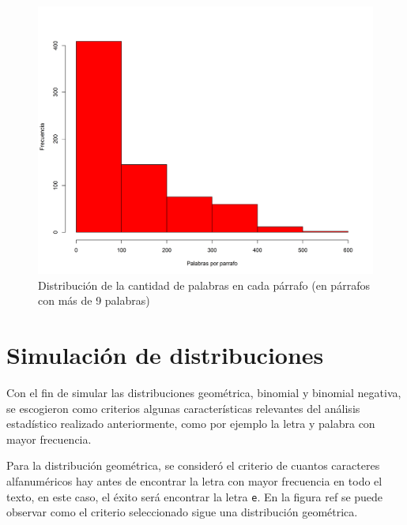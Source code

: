 \documentclass{article}
\begin{document}
\begin{figure}
\centering
\includegraphics[scale=0.5]{Figures/palParrafos.png}
\caption{Distribución de la cantidad de palabras en cada párrafo (en párrafos con más de 9 palabras)}
\label{palParrafos}
\end{figure}

\section{Simulación de distribuciones}
Con el fin de simular las distribuciones geométrica, binomial y binomial negativa, se escogieron como criterios algunas características relevantes del análisis estadístico realizado anteriormente, como por ejemplo la letra y palabra con mayor frecuencia.

Para la distribución geométrica, se consideró el criterio de cuantos caracteres alfanuméricos hay antes de encontrar la letra con mayor frecuencia en todo el texto, en este caso, el éxito será encontrar la letra \texttt{e}. En la figura ref{} se puede observar como el criterio seleccionado sigue una distribución geométrica.
\end{document}
